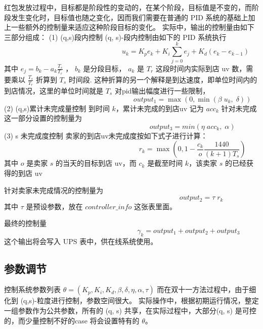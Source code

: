 红包发放过程中，目标都是阶段性的变动的，在某个阶段，目标值是不变的，而阶段发生变化时，目标值也随之变化，因而我们需要在普通的 PID 系统的基础上加上一些额外的控制量来适应这种阶段目标的变化。 实际中，输出的控制量由如下三部分组成：
(1) (q,s)段内控制
(q, s)-段内控制由如下的 PID 系统执行
$$\;\;\;\;\;\;\;\;\;\;\;\;\;\;\;\;\;\;\;\;\;\;\;\;\;\;\;\;\;\;\;\;\;\;\;\;\;\;\;\;\;\;\;\;\;\;\;\;\;\;\;\;\;\;\;u_k = K_p e_k + K_i \sum_{j=0}^k e_j + K_d (e_k - e_{k-1}) $$
其中 $e_j = b_k -  a_k \frac{T_s}{T_r} $ ， $b_k$ 是分段目标， $a_k$ 是 $T_r$ 这段时间内实际到店 uv 数，需要乘以  $\frac{T_s}{T_r}$ 折算到 $T_s$ 时间段. 这种折算的另一个解释是到达速度，即单位时间内的到店情况，这里的单位时间就是 $T_s$
对pid输出幅度进行一些限制，
$$\;\;\;\;\;\;\;\;\;\;\;\;\;\;\;\;\;\;\;\;\;\;\;\;\;\;\;\;\;\;\;\;\;\;\;\;\;\;\;\;\;\;\;\;\;\;\;\;\;\;\;\;\;\;\;\;\;\;\;\;\;\;output_1 =  \max(0, \min(\beta\; u_k,\; \delta)) $$
(2) (q,s)累计未完成量控制
到时间 $k$，累计未完成的到店uv 记为  $acc_k$
针对未完成这一部分设置的控制量为
 $$\;\;\;\;\;\;\;\;\;\;\;\;\;\;\;\;\;\;\;\;\;\;\;\;\;\;\;\;\;\;\;\;\;\;\;\;\;\;\;\;\;\;\;\;\;\;\;\;\;\;\;\;\;\;\;\;\;\;\;\;\;\;output_3 = min(\eta \; acc_k, \;\alpha)$$
(3) s 未完成度控制
卖家的到店uv未完成度按如下式子进行计算：
$$\;\;\;\;\;\;\;\;\;\;\;\;\;\;\;\;\;\;\;\;\;\;\;\;\;\;\;\;\;\;\;\;\;\;\;\;\;\;\;\;\;\;\;\;\;\;\;\;\;\;\;\;\;\;\;\;\;\;\;\;\;\;r_k = \max(0, 1 - \frac{c_k}{o} \frac{1440}{(k+1) T_s} )$$
其中 $o$ 是卖家 $s$ 的当天的目标到店 uv，而 $c_{k}$ 是截至时间 $k$，该卖家 $s$ 的已经获得的到店 uv 

针对卖家未完成情况的控制量为 
$$\;\;\;\;\;\;\;\;\;\;\;\;\;\;\;\;\;\;\;\;\;\;\;\;\;\;\;\;\;\;\;\;\;\;\;\;\;\;\;\;\;\;\;\;\;\;\;\;\;\;\;\;\;\;\;\;\;\;\;\;\;\;\;\;\;\;\;\;\;\;\;output_2 = \tau \;r_k  $$
其中 $\tau$ 是预设参数，放在 $controller\_info$ 这张表里面。

最终的控制量 
$$\;\;\;\;\;\;\;\;\;\;\;\;\;\;\;\;\;\;\;\;\;\;\;\;\;\;\;\;\;\;\;\;\;\;\;\;\;\;\;\;\;\;\;\;\;\;\;\;\;\;\;\;\;\;\;\;\;\;\gamma_k = output_1 + output_2 + output_3$$
这个输出将会写入 UPS 表中，供在线系统使用。

\subsection{参数调节}
控制系统参数列表 $\theta=(K_p, K_i, K_d, \beta, \delta, \eta, \alpha, \tau)$
而在双十一方法过程中，由于细化到 (q,s)-粒度进行控制，参数空间很大。
实际操作中，根据初期运行情况，整定一组参数作为公共参数，所有的 (q, s) 共享，在实际过程中，大部分(q, s) 是可控的，而少量控制不好的case 将会设置特有的 $\theta $。


